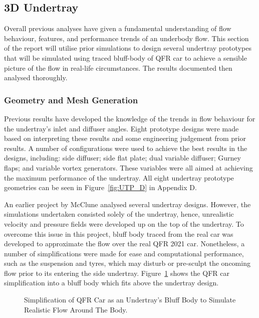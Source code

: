 
\subsection{3D Undertray}
Overall previous analyses have given a fundamental understanding of flow behaviour, features, and performance trends of an underbody flow. This section of the report will utilise prior simulations to design several undertray prototypes that will be simulated using traced bluff-body of QFR car to achieve a sensible picture of the flow in real-life circumstances. The results documented then analysed thoroughly.

\subsubsection{Geometry and Mesh Generation}
\noindent Previous results have developed the knowledge of the trends in flow behaviour for the undertray's inlet and diffuser angles. Eight prototype designs were made based on interpreting these results and some engineering judgement from prior results. A number of configurations were used to achieve the best results in the designs, including: side diffuser; side flat plate; dual variable diffuser; Gurney flaps; and variable vortex generators. These variables were all aimed at achieving the maximum performance of the undertray. All eight undertray prototype geometries can be seen in Figure~\ref{fig:UTP_D} in Appendix D.


\noindent An earlier project by McClune \cite{McClune2018DesignCar} analysed several undertray designs. However, the simulations undertaken consisted solely of the undertray, hence, unrealistic velocity and pressure fields were developed up on the top of the undertray. To overcome this issue in this project, bluff body traced from the real car was developed to approximate the flow over the real QFR 2021 car. Nonetheless, a number of simplifications were made for ease and computational performance, such as the suspension and tyres, which may disturb or pre-sculpt the oncoming flow prior to its entering the side undertray. Figure~\ref{fig:3D_UT_BB_SIMPLIFICATION} shows the QFR car simplification into a bluff body which fits above the undertray design.

\begin{figure}[!htb] 
    \centering
    \noindent{}
    \caption{Simplification of QFR Car as an Undertray's Bluff Body to Simulate Realistic Flow Around The Body.}
      \label{fig:3D_UT_BB_SIMPLIFICATION}
\end{figure}

